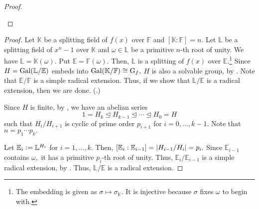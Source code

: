 \begin{proof}
\begin{center}
    \end{center}    
\end{proof}

\solvgroupimpliesradical*\label{thm:solvgroupimpliesradical2}
\begin{flushright}\hyperref[thm:solvgroupimpliesradical]{\upsym}\end{flushright}
\begin{proof}
    Let $\mathbb{K}$ be a splitting field of $f(x)$ over $\mathbb{F}$ and $[\mathbb{K} : \mathbb{F}] = n.$ Let $\mathbb{L}$ be a splitting field of $x^n - 1$ over $\mathbb{K}$ and $\omega \in \mathbb{L}$ be a primitive $n$-th root of unity. We have $\mathbb{L} = \mathbb{K}(\omega).$ Put $\mathbb{E} = \mathbb{F}(\omega).$ Then, $\mathbb{L}$ is a splitting of $f(x)$ over $\mathbb{E}.$\footnote{The embedding is given as $\sigma \mapsto \sigma_{\mathbb{K}}.$ It is injective because $\sigma$ fixes $\omega$ to begin with.} Since $H = \operatorname{Gal}(\mathbb{L}/\mathbb{E})$ embeds into $\operatorname{Gal}(\mathbb{K}/\mathbb{F}) \cong \operatorname{G}_f,$ $H$ is also a solvable group, by . Note that $\mathbb{E}/\mathbb{F}$ is a simple radical extension. Thus, if we show that $\mathbb{L}/\mathbb{E}$ is a radical extension, then we are done. (.)

    Since $H$ is finite, by , we have an abelian series
    \begin{equation*} 
        1 = H_k \unlhd H_{k - 1} \unlhd \cdots \unlhd H_0 = H
    \end{equation*}
    such that $H_i/H_{i + 1}$ is cyclic of prime order $p_{i + 1}$ for $i = 0, \ldots, k - 1.$ Note that $n = p_1 \cdots p_k.$

    Let $\mathbb{E}_i \vcentcolon= \mathbb{L}^{H_i}$ for $i = 1, \ldots, k.$ Then, $[\mathbb{E}_i : \mathbb{E}_{i - 1}] = {\left\lvert H_{i - 1}/H_i \right\lvert} = p_i.$ Since $\mathbb{E}_{i - 1}$ contains $\omega,$ it has a primitive $p_i$-th root of unity. Thus, $\mathbb{E}_i/\mathbb{E}_{i - 1}$ is a simple radical extension, by . Thus, $\mathbb{L}/\mathbb{E}$ is a radical extension.
\end{proof}

